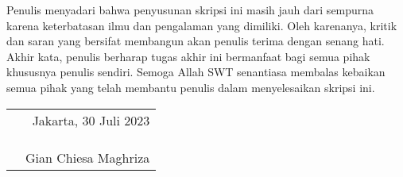 Penulis menyadari bahwa penyusunan skripsi ini masih jauh dari sempurna karena keterbatasan ilmu dan pengalaman yang dimiliki. Oleh karenanya, kritik dan saran yang bersifat membangun akan penulis terima dengan senang hati. Akhir kata, penulis berharap tugas akhir ini bermanfaat bagi semua pihak khususnya penulis sendiri. Semoga Allah SWT senantiasa membalas kebaikan semua pihak yang telah membantu penulis dalam menyelesaikan skripsi ini.

\vspace{4cm}

\begin{tabular}{p{}r}
	&Jakarta, 30 Juli 2023\\
	&\\
	&\\
	&\\
	&Gian Chiesa Maghriza
\end{tabular}